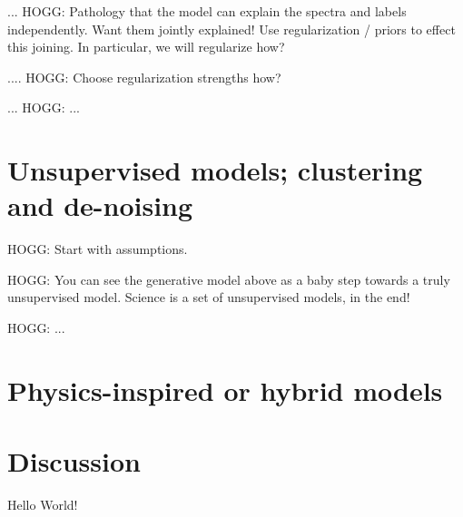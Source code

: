 \documentclass[modern]{aastex631}
\begin{document}
... HOGG: Pathology that the model can explain the spectra and labels independently. Want them jointly explained! Use regularization / priors to effect this joining. In particular, we will regularize how?

.... HOGG: Choose regularization strengths how?

... HOGG: ...

\section{Unsupervised models; clustering and de-noising}

HOGG: Start with assumptions.

HOGG: You can see the generative model above as a baby step towards a truly unsupervised model. Science is a set of unsupervised models, in the end!

HOGG: ...

\section{Physics-inspired or hybrid models}

\section{Discussion}

Hello World!

{}

\end{document}
